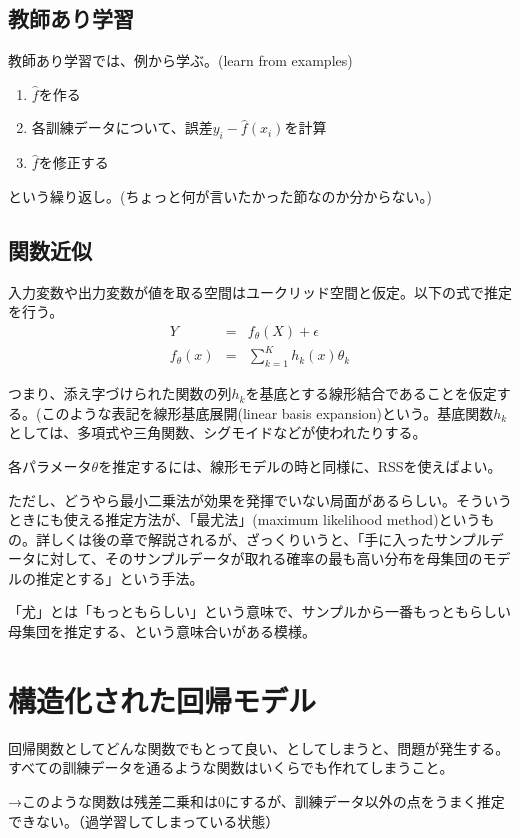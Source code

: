 \documentclass[uplatex]{jsarticle}
\begin{document}
\subsection{教師あり学習}
教師あり学習では、例から学ぶ。(learn from examples)
\begin{enumerate}
  \item $\hat{f}$を作る
  \item 各訓練データについて、誤差$y_i - \hat{f}(x_i)$を計算
  \item $\hat{f}$を修正する
\end{enumerate}

という繰り返し。(ちょっと何が言いたかった節なのか分からない。)

\subsection{関数近似}
入力変数や出力変数が値を取る空間はユークリッド空間と仮定。以下の式で推定を行う。
\begin{eqnarray*}
  Y&=&f_\theta(X) + \epsilon \\
  f_\theta(x) &=& \sum_{k=1}^Kh_k(x)\theta_k
\end{eqnarray*}

つまり、添え字づけられた関数の列$h_k$を基底とする線形結合であることを仮定する。(このような表記を線形基底展開(linear basis expansion)という。基底関数$h_k$としては、多項式や三角関数、シグモイドなどが使われたりする。

各パラメータ$\theta$を推定するには、線形モデルの時と同様に、RSSを使えばよい。

ただし、どうやら最小二乗法が効果を発揮でいない局面があるらしい。そういうときにも使える推定方法が、「最尤法」(maximum likelihood method)というもの。詳しくは後の章で解説されるが、ざっくりいうと、「手に入ったサンプルデータに対して、そのサンプルデータが取れる確率の最も高い分布を母集団のモデルの推定とする」という手法。

「尤」とは「もっともらしい」という意味で、サンプルから一番もっともらしい母集団を推定する、という意味合いがある模様。

\section{構造化された回帰モデル}
回帰関数としてどんな関数でもとって良い、としてしまうと、問題が発生する。すべての訓練データを通るような関数はいくらでも作れてしまうこと。

→このような関数は残差二乗和は0にするが、訓練データ以外の点をうまく推定できない。（過学習してしまっている状態）
\end{document}
